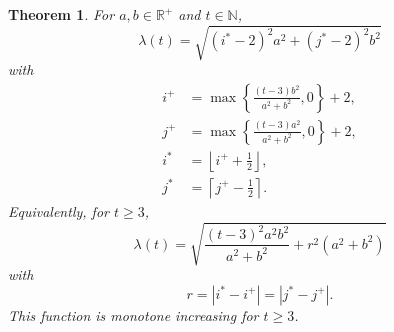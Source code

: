 \documentclass[12pt, a4paper]{article}
\newcommand{\funl}{\lambda} %
\newcommand{\tiles}{t} %
\newcommand{\isolr}{i^+}
\newcommand{\jsolr}{j^+}
\newcommand{\isoli}{i^\ast}
\newcommand{\jsoli}{j^\ast}
\newcommand{\roundterm}{r}
\newtheorem{theorem}{Theorem}%
\begin{document}
\begin{theorem}
\label{theo: funl, form}
For $a, b \in \mathbb R^+$ and $\tiles \in \mathbb N$,
\begin{equation}
\label{eq: theo: funl, form; funl}
\funl(\tiles) = \sqrt{(\isoli-2)^2 a^2 + (\jsoli-2)^2 b^2}
\end{equation}
with
\begin{align}
\label{eq: theo: funl, form; isolr}
\isolr &= \max\left\{ \frac{(\tiles-3) b^2}{a^2+b^2}, 0 \right\} + 2, \\
\label{eq: theo: funl, form; jsolr}
\jsolr &= \max\left\{ \frac{(\tiles-3) a^2}{a^2+b^2}, 0 \right\} + 2, \\
\label{eq: theo: funl, form; isoli}
\isoli &= \left\lfloor \isolr + \frac 1 2 \right\rfloor, \\
\label{eq: theo: funl, form; jsoli}
\jsoli &= \left\lceil \jsolr - \frac 1 2 \right\rceil.
\end{align}
Equivalently, for $\tiles \geq 3$,
\begin{equation}
\label{eq: theo: funl, form; funl 2}
\funl(\tiles) = \sqrt{\frac{(\tiles-3)^2 a^2 b^2}{a^2+b^2} + \roundterm^2(a^2+b^2)}
\end{equation}
with
\begin{equation}
\label{eq: roundterm}
\roundterm = |\isoli - \isolr| = |\jsoli - \jsolr|.
\end{equation}
This function is monotone increasing for $\tiles \geq 3$.
\end{theorem}
\end{document}
